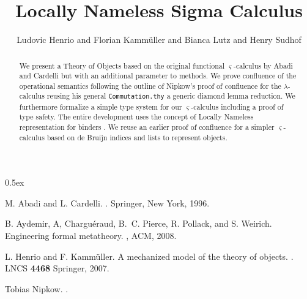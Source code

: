 \documentclass[11pt,a4paper]{article}
\begin{document}
\title{Locally Nameless Sigma Calculus}
\author{Ludovic Henrio and Florian Kamm\"uller and Bianca Lutz and Henry Sudhof}
\maketitle

\begin{abstract}
We present a Theory of Objects based on the original functional
$\varsigma$-calculus by Abadi and Cardelli \cite{AC96a} but with an
additional parameter to methods. We prove confluence of the operational
semantics following the outline of Nipkow's proof of confluence for the
$\lambda$-calculus reusing his general \texttt{Commutation.thy}
\cite{nip:01} a generic diamond lemma reduction. 
We furthermore formalize a simple type system for our $\varsigma$-calculus
including a proof of type safety.
The entire development uses the concept of Locally Nameless representation
for binders \cite{ACPPW:POPL08}. We reuse an earlier proof of confluence
\cite{HK:FMOODS07} for a simpler $\varsigma$-calculus based on de Bruijn indices
and lists to represent objects. 
\end{abstract}

\tableofcontents

\parindent 0pt\parskip 0.5ex



%
%


\begin{thebibliography}{10}
M. Abadi and L. Cardelli.
.
\newblock Springer, New York, 1996.


B. Aydemir, A, Charguéraud, B.~C. Pierce, R. Pollack, and
  S. Weirich.
\newblock Engineering formal metatheory.
, ACM, 2008. 

L. Henrio and F. Kammüller.
\newblock A mechanized model of the theory of objects.
. 
LNCS \textbf{4468} Springer, 2007.


Tobias Nipkow.
. 
\end{thebibliography}
\end{document}
